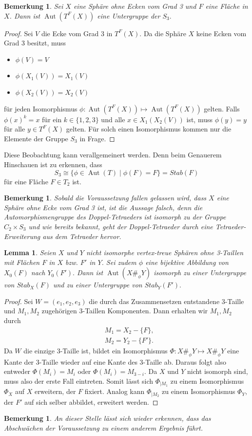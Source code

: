 \documentclass[12pt,titlepage,twoside,cleardoublepage]{article}
\theoremstyle{nummermitklammern}
\newtheorem{lemma}[temp]{Lemma}
\newtheorem{bemerkung}[temp]{Bemerkung}
\newtheorem{lemma}[zahl]{Lemma}
\newtheorem{bemerkung}[zahl]{Bemerkung}
\numberwithin{equation}{section}
\DeclareMathOperator{\Aut}{Aut}
\begin{document}
\begin{bemerkung}
Sei $X$ eine Sphäre ohne Ecken vom Grad 3 und $F$ eine Fläche in $X$. Dann ist $\Aut(T^F(X))$ eine Untergruppe der $S_3.$ 
\end{bemerkung}
\begin{proof}
Sei $V$ die Ecke vom Grad 3 in $T^F(X).$
Da die Sphäre $X$ keine Ecken vom Grad 3 besitzt, muss
\begin{itemize}
\item $\phi(V)=V$
\item $\phi (X_1(V))=X_1(V)$
\item $\phi (X_2(V))=X_2(V)$
\end{itemize}
für jeden Isomorphismus $\phi:\Aut({T}^F(X))\mapsto \Aut({T}^F(X))$ gelten. Falls $\phi(x)^k=x$ für ein $k \in \{1,2,3\}$ und alle $x \in X_1(X_2(V))$ ist, muss $\phi(y)=y$ für alle $y\in T^F(X)$ gelten. Für solch einen Isomorphismus kommen nur die Elemente der Gruppe $S_3$ in Frage. 
\end{proof}
Diese Beobachtung kann verallgemeinert werden. Denn beim Genauerem Hinschauen ist zu erkennen, dass 
\[
S_3\cong\{\phi\in \Aut(T)\mid \phi(F)=F\}=Stab(F)
\] für eine Fläche $F\in T_2$ ist.
\begin{bemerkung}
Sobald die Voraussetzung fallen gelassen wird, dass $X$ eine Sphäre ohne Ecke vom Grad 3 ist, ist die Aussage falsch, denn die Automorphismengruppe des Doppel-Tetraeders ist isomorph zu der Gruppe $C_2\times S_3$ und wie bereits bekannt, geht der Doppel-Tetraeder durch eine Tetraeder-Erweiterung aus dem  Tetraeder hervor.
\end{bemerkung}
\begin{lemma}
Seien $X$ und $Y$ nicht isomorphe vertex-treue Sphären ohne 3-Taillen mit Flächen $F$ in $X$ bzw. $F'$ in $Y$. Sei zudem $\phi$ eine bijektive Abbildung von $X_0(F)$ nach $Y_0(F').$ Dann ist $\Aut(X\#_\phi Y)$ isomorph zu einer Untergruppe von $Stab_X(F)$ und zu einer Untergruppe von $Stab_Y(F').$
\end{lemma}
\begin{proof}
Sei $W=(e_1,e_2,e_3)$ die durch das Zusammensetzen entstandene 3-Taille und $M_1,M_2$ zugehörigen 3-Taillen Komponenten. Dann erhalten wir $M_1,M_2$ durch 
\begin{align*}
 &M_1=X_2-\{F\}, \\
 &M_2=Y_2-\{F'\}. 
 \end{align*}
 Da $W$ die einzige 3-Taille ist, bildet ein Isomorphismus $\Phi:X\#_{\phi}Y \mapsto X\#_{\phi}Y$  eine Kante der 3-Taille wieder auf eine Kante des 3-Taille ab. Daraus folgt also entweder $\Phi(M_i)=M_i$ oder $\Phi(M_i)=M_{3-i}.$ Da $X$ und $Y$ nicht isomorph sind, muss also der erste Fall eintreten. Somit lässt sich \textsc{$\Phi_{\mid M_1}$} zu einem Isomorphismus $\Phi_X$ auf $X$ erweitern, der $F$ fixiert. Analog kann $\Phi_{\mid M_2}$ zu einem Isomorphismus $\Phi_Y,$ der $F'$ auf sich selber abbildet, erweitert werden.
\end{proof}
\begin{bemerkung}
An dieser Stelle lässt sich wieder erkennen, dass das Abschwächen
der Voraussetzung zu einem anderem Ergebnis führt.
\end{bemerkung}
\end{document}
